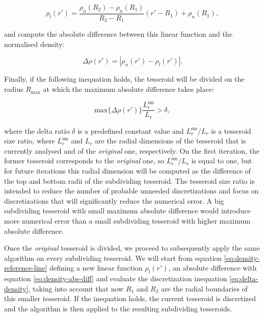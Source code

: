 \documentclass[extra]{gji}
\begin{document}
\begin{equation}
    \rho_l(r') =
    \frac{ \rho_n(R_2) - \rho_n(R_1) }{ R_2 - R_1 } (r' - R_1) + \rho_n(R_1),
    \label{eq:density-reference-line}
\end{equation}

\noindent and compute the absolute difference between this linear 
function and the normalised density:

\begin{equation}
    \Delta \rho (r') = | \rho_n(r') - \rho_l(r') |.
    \label{eq:density-abs-diff}
\end{equation}

Finally, if the following inequation holds, the tesseroid will be divided on 
the radius $R_\text{max}$ at which the maximum absolute difference takes 
place:

\begin{equation}
    \text{max}\{ \Delta \rho(r') \} \frac{L_r^\text{sm}}{L_r} > \delta,
    \label{eq:delta-density}
\end{equation}

\noindent where the delta ratio $\delta$ is a predefined constant value 
and $L_r^\text{sm}/L_r$ is a tesseroid size ratio, where 
$L_r^\text{sm}$ and $L_r$ are the radial dimensions of the tesseroid 
that is currently analysed and of the \emph{original} one, 
respectively.
On the first iteration, the former tesseroid corresponds to the 
\emph{original} one, so $L_r^\text{sm}/L_r$ is equal to one, but for 
future iterations this radial dimension will be computed as the 
difference of the top and bottom radii of the subdividing tesseroid.
The tesseroid size ratio is intended to reduce the number of probable 
unneeded discretizations and focus on discretizations that will 
significantly reduce the numerical error.
A big subdividing tesseroid with small maximum absolute difference would 
introduce more numerical error than a small subdividing tesseroid with 
higher maximum absolute difference.

Once the \emph{original} tesseroid is divided, we proceed to 
subsequently apply the same algorithm on every subdividing tesseroid.
We will start from equation \ref{eq:density-reference-line} defining a 
new linear function $\rho_l(r')$, an absolute difference with equation 
\ref{eq:density-abs-diff} and evaluate the discretization inequation 
\ref{eq:delta-density}, taking into account that now $R_1$ and $R_2$ 
are the radial boundaries of this smaller tesseroid.
If the inequation holds, the current tesseroid is discretized and the 
algorithm is then applied to the resulting subdividing tesseroids.
\end{document}
